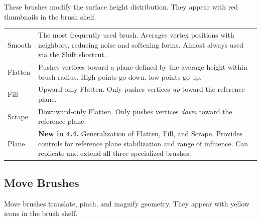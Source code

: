 These brushes modify the surface height distribution. They appear with red thumbnails in the brush shelf.

\begin{center}
\begin{tabularx}{\textwidth}{L{3cm}X}
\toprule
{}
 &  \\
\midrule
Smooth & The most frequently used brush. Averages vertex positions with neighbors, reducing noise and softening forms. Almost always used via the Shift shortcut. \\
Flatten & Pushes vertices toward a plane defined by the average height within brush radius. High points go down, low points go up. \\
Fill & Upward-only Flatten. Only pushes vertices \textit{up} toward the reference plane. \\
Scrape & Downward-only Flatten. Only pushes vertices \textit{down} toward the reference plane. \\
Plane & \textbf{New in 4.4.} Generalization of Flatten, Fill, and Scrape. Provides controls for reference plane stabilization and range of influence. Can replicate and extend all three specialized brushes. \\
\bottomrule
\end{tabularx}
\end{center}

\subsection{Move Brushes}
\label{sec:movebrushes}

Move brushes translate, pinch, and magnify geometry. They appear with yellow icons in the brush shelf.

